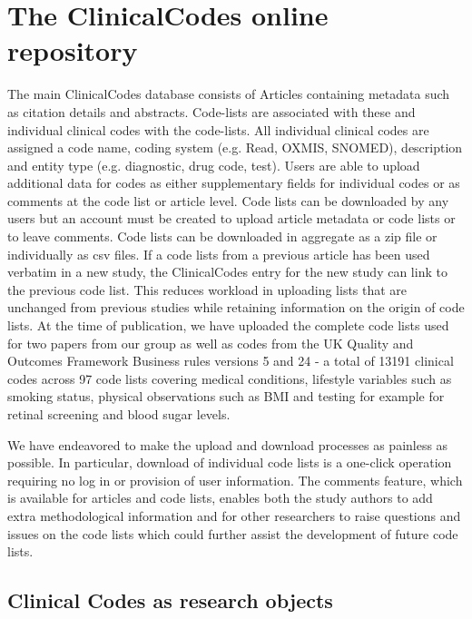 \documentclass[10pt]{article}
\begin{document}
\section*{The ClinicalCodes online repository}

The main ClinicalCodes database consists of Articles containing metadata such as citation details and abstracts.  Code-lists are associated with these and individual clinical codes with the code-lists. All individual clinical codes are assigned a code name, coding system (e.g. Read, OXMIS, SNOMED), description and entity type (e.g. diagnostic, drug code, test).  Users are able to upload additional data for codes as either supplementary fields for individual codes or as comments at the code list or article level.  Code lists can be downloaded by any users but an account must be created to upload article metadata or code lists or to leave comments. Code lists can be downloaded in aggregate as a zip file or individually as csv files. If a code lists from a previous article has been used verbatim in a new study, the ClinicalCodes entry for the new study can link to the previous code list.  This reduces workload in uploading lists that are unchanged from previous studies while retaining information on the origin of code lists.  At the time of publication, we have uploaded the complete code lists used for two papers from our group \cite{Doran2011, Kontopantelis2014} as well as codes from the UK Quality and Outcomes Framework Business rules versions 5 and 24 - a total of 13191 clinical codes across 97 code lists covering medical conditions, lifestyle variables such as smoking status, physical observations such as BMI and testing for example for retinal screening and blood sugar levels.

We have endeavored to make the upload and download processes as painless as possible. In particular, download of individual code lists is a one-click operation requiring no log in or provision of user information.  The comments feature, which is available for articles and code lists, enables both the study authors to add extra methodological information and for other researchers to raise questions and issues on the code lists which could further assist the development of future code lists.



\subsection*{Clinical Codes as research objects}
\end{document}
